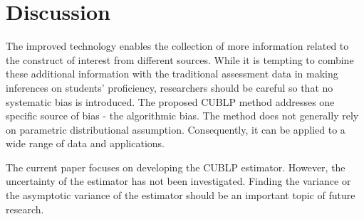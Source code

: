 \documentclass[man, floatsintext]{apa7}
\begin{document}
  \section{Discussion}
  The improved technology enables the collection of more information related to
  the construct of interest from different sources. While it is tempting to
  combine these additional information with the traditional assessment data in
  making inferences on students' proficiency, researchers should be careful so
  that no systematic bias is introduced. The proposed CUBLP method addresses
  one specific source of bias - the algorithmic bias. The method does not
  generally rely on parametric distributional assumption. Consequently, it can
  be applied to a wide range of data and applications.

  The current paper focuses on developing the CUBLP estimator. However, the
  uncertainty of the estimator has not been investigated. Finding the variance
  or the asymptotic variance of the estimator should be an important topic of
  future research.




  \printbibliography
  
\end{document}
